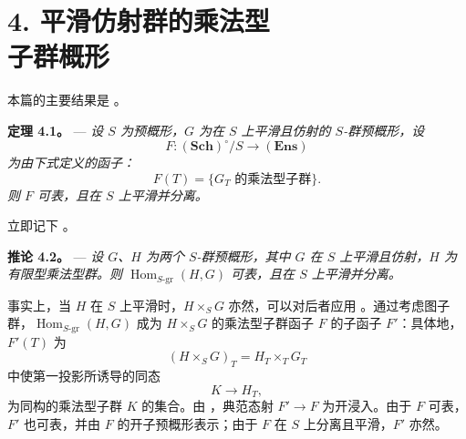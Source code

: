
\section*{4. 平滑仿射群的乘法型\\子群概形}

本篇的主要结果是 。

\medskip\noindent{}\textbf{定理 4.1。} --- \textit{设 \(S\) 为预概形，\(G\) 为在 \(S\) 上平滑且仿射的 \(S\)-群预概形，设} \[
  F\colon(\mathbf{Sch})^\circ/S\longrightarrow(\mathbf{Ens})
\]\textit{为由下式定义的函子：}  \[
  F(T)=\{\text{\(G_T\) 的乘法型子群}\}.
\]\textit{则 \(F\) 可表，且在 \(S\) 上平滑并分离。}

立即记下 。

\medskip\noindent{}\textbf{推论 4.2。} --- \textit{设 \(G\)、\(H\) 为两个 \(S\)-群预概形，其中 \(G\) 在 \(S\) 上平滑且仿射，\(H\) 为有限型乘法型群。则 \(\operatorname{Hom}_{S\text{-}\mathrm{gr}}(H,G)\) 可表，且在 \(S\) 上平滑并分离。}

事实上，当 \(H\) 在 \(S\) 上平滑时，\(H\times_S G\) 亦然，可以对后者应用 。通过考虑图子群，\(\operatorname{Hom}_{S\text{-}\mathrm{gr}}(H,G)\) 成为 \(H\times_S G\) 的乘法型子群函子 \(F\) 的子函子 \(F'\)：具体地，\(F'(T)\) 为 \[
  (H\times_S G)_T=H_T\times_TG_T
\] 中使第一投影所诱导的同态  \[
  K\longrightarrow H_T,
\] 为同构的乘法型子群 \(K\) 的集合。由 ，典范态射 \(F'\to F\) 为开浸入。由于 \(F\) 可表，\(F'\) 也可表，并由 \(F\) 的开子预概形表示；由于 \(F\) 在 \(S\) 上分离且平滑，\(F'\) 亦然。

